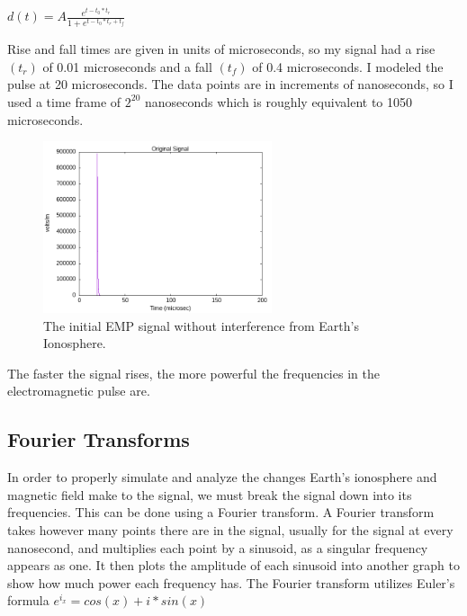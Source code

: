 \documentclass[12pt, reqno]{amsart}
\begin{document}
\begin{center}
    $d(t)=A\frac{e^{t-t_0*t_r}}{1 + e^{t-t_0*t_r + t_f}}$
\end{center}

\noindent Rise and fall times are given in units of microseconds, so my signal had a rise $(t_r)$ of 0.01 microseconds and a fall $(t_f)$ of 0.4 microseconds. I modeled the pulse at 20 microseconds. The data points are in increments of nanoseconds, so I used a time frame of $2^{20}$ nanoseconds
which is roughly equivalent to 1050 microseconds.

\begin{figure}[h]
    \centering
    \includegraphics[width= 0.6\textwidth]{emp_original_signal.png}
    \caption{\small The initial EMP signal without interference from Earth's Ionosphere.}
    \label{fig:test-08}
\end{figure}

The faster the signal rises, the more powerful the frequencies in the electromagnetic pulse are.

\subsection{Fourier Transforms}
In order to properly simulate and analyze the changes Earth's ionosphere and magnetic field make to the signal, we must break the signal down into its frequencies. This can be done using a Fourier transform. A Fourier transform takes however many points there are in the signal, usually for the signal at every nanosecond, and multiplies each point by a sinusoid, as a singular frequency appears as one. It then plots the amplitude of each sinusoid into another graph to show how much power each frequency has. The Fourier transform utilizes Euler's formula $e^{i_x} = cos(x) + i*sin(x)$
\end{document}
